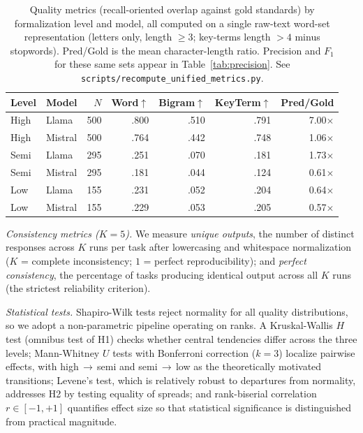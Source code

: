 \documentclass[runningheads]{llncs}
\begin{document}
\begin{table}[htbp]
\centering
\caption{Quality metrics (recall-oriented overlap against gold standards) by formalization level and model, all computed on a single raw-text word-set representation (letters only, length $\geq 3$; key-terms length $>4$ minus stopwords). Pred/Gold is the mean character-length ratio. Precision and $F_1$ for these same sets appear in Table~\ref{tab:precision}. See \texttt{scripts/recompute\_unified\_metrics.py}.}
\label{tab:quality}
\setlength{\tabcolsep}{5pt}
\begin{tabular}{llrrrrr}
\toprule
Level & Model & $N$ & Word$\uparrow$ & Bigram$\uparrow$ & KeyTerm$\uparrow$ & Pred/Gold \\
\midrule
High  & Llama   & 500 & .800 & .510 & .791 & 7.00$\times$ \\
High  & Mistral & 500 & .764 & .442 & .748 & 1.06$\times$ \\
Semi  & Llama   & 295 & .251 & .070 & .181 & 1.73$\times$ \\
Semi  & Mistral & 295 & .181 & .044 & .124 & 0.61$\times$ \\
Low   & Llama   & 155 & .231 & .052 & .204 & 0.64$\times$ \\
Low   & Mistral & 155 & .229 & .053 & .205 & 0.57$\times$ \\
\bottomrule
\end{tabular}
\end{table}

\noindent
\textit{Consistency metrics ($K\!=\!5$).}
We measure \textit{unique outputs}, the number of distinct responses across $K$ runs per task after lowercasing and whitespace normalization ($K$ = complete inconsistency; $1$ = perfect reproducibility); and \textit{perfect consistency}, the percentage of tasks producing identical output across all $K$ runs (the strictest reliability criterion).

\vspace{5pt}
\noindent
\textit{Statistical tests.}
Shapiro-Wilk tests reject normality for all quality distributions, so we adopt a non-parametric pipeline operating on ranks. A Kruskal-Wallis $H$ test (omnibus test of H1) checks whether central tendencies differ across the three levels; Mann-Whitney $U$ tests with Bonferroni correction ($k\!=\!3$) localize pairwise effects, with high$\,\to\,$semi and semi$\,\to\,$low as the theoretically motivated transitions; Levene's test, which is relatively robust to departures from normality, addresses H2 by testing equality of spreads; and rank-biserial correlation $r \in [-1,+1]$ quantifies effect size so that statistical significance is distinguished from practical magnitude.
\end{document}
